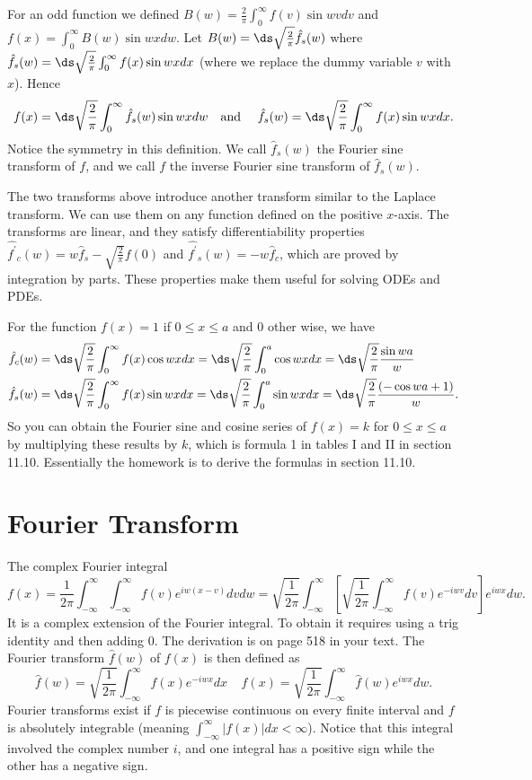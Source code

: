 For an odd function we defined $B(w) = \frac{2}{\pi}\int_{0}^{\infty} f(v)\sin w v dv$ and $f(x) = \int_{0}^\infty B(w) \sin w xdw.$ Let $B(w) =\ds\sqrt{\frac{2}{\pi}}\hat f_s (w)$ where $\hat f_s(w) = \ds\sqrt{\frac{2}{\pi}}\int_{0}^{\infty} f(x)\sin w x dx$ (where we replace the dummy variable $v$ with $x$). Hence $$ f(x) = \ds\sqrt{\frac{2}{\pi}}\int_{0}^{\infty} \hat f_s(w)\sin w x dw \ \ \text{ and }\ \ \ \hat f_s(w) = \ds\sqrt{\frac{2}{\pi}}\int_{0}^{\infty} f(x)\sin w x dx.$$ 
Notice the symmetry in this definition.  We call $\hat f_s(w)$ the Fourier sine transform of $f$, and we call $f$ the inverse Fourier sine transform of $\hat f_s(w)$. 

The two transforms above introduce another transform similar to the Laplace transform. We can use them on any function defined on the positive $x$-axis. The transforms are linear, and they satisfy differentiability properties $\widehat{f^\prime}_c(w) = w\hat f_s-\sqrt{\frac{2}{\pi}}f(0)$ and  $\widehat{f^\prime}_s(w) = -w\hat f_c$, which are proved by integration by parts. These properties make them useful for solving ODEs and PDEs.

For the function $f(x) = 1$ if $0\leq x\leq a$ and 0 other wise, we have 
\begin{align*}
\hat f_c(w) 
&= \ds\sqrt{\frac{2}{\pi}}\int_{0}^{\infty} f(x)\cos w x dx
= \ds\sqrt{\frac{2}{\pi}}\int_{0}^{a} \cos w x dx
= \ds\sqrt{\frac{2}{\pi}}\frac{\sin w a }{w}
\\
\hat f_s(w) 
&= \ds\sqrt{\frac{2}{\pi}}\int_{0}^{\infty} f(x)\sin w x dx
= \ds\sqrt{\frac{2}{\pi}}\int_{0}^{a} \sin w x dx
= \ds\sqrt{\frac{2}{\pi}}\frac{(-\cos w a +1)}{w} .
\end{align*}
So you can obtain the Fourier sine and cosine series of $f(x) = k$ for $0\leq x\leq a$ by multiplying these results by $k$, which is formula 1 in tables I and II in section 11.10.  Essentially the homework is to derive the formulas in section 11.10.

\section{Fourier Transform}

The  complex Fourier integral 
$$f(x) = \frac{1}{2\pi}\int_{-\infty}^{\infty}\int_{-\infty}^{\infty} f(v) e^{iw(x-v)}dvdw = \sqrt{\frac{1}{2\pi}}\int_{-\infty}^{\infty}\left[\sqrt{\frac{1}{2\pi}}\int_{-\infty}^{\infty} f(v) e^{-iwv}dv\right]e^{iwx}dw.
$$ 
It is a complex extension of the Fourier integral.  To obtain it requires using a trig identity and then adding 0.  The derivation is on page 518 in your text. The Fourier transform $\hat f (w)$ of $f(x)$ is then defined as 
$$\hat f (w) = \sqrt{\frac{1}{2\pi}}\int_{-\infty}^{\infty} f(x) e^{-iwx}dx\ \ \ \ \ f (x) = \sqrt{\frac{1}{2\pi}}\int_{-\infty}^{\infty} \hat f(w) e^{iwx}dw.$$ Fourier transforms exist if $f$ is piecewise continuous on every finite interval and $f$ is absolutely integrable (meaning $\int_{-\infty}^\infty |f(x)|dx<\infty$). Notice that this integral involved the complex number $i$, and one integral has a positive sign while the other has a negative sign.  

